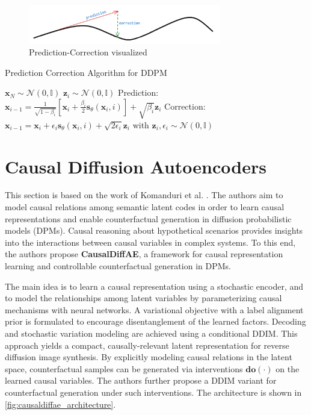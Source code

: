 \documentclass{article}
\newcommand{\x}{\mathbf{x}}
\newcommand{\N}{\mathcal{N}}
\begin{document}
	 \begin{figure}[H]
	 	\centering
	 	\includegraphics[width=0.75\textwidth]{prediction-correction} 
	 	\caption{Prediction-Correction visualized}
	 	\label{fig:prediction_correction}
	 \end{figure}
	
	 \begin{algorithm}[H]
	 \caption{Prediction Correction Algorithm for DDPM \cite{song2021}}
	 \begin{algorithmic}[1]
	 	\State $\x_N \sim \N (0, \mathbb{I})$
	 		\State $\boldsymbol{z}_i \sim \N(0, \mathbb{I})$
		 	\State Prediction: $\displaystyle \x_{i-1} = \frac{1}{\sqrt{1 - \beta_i}} \left[ \x_i + \frac{\beta_i}{2} \boldsymbol{s}_\theta (\x_i, i) \right] + \sqrt{\beta_i} \boldsymbol{z}_i$ 
		 		\State Correction: $\x_{i-1} = \x_i + \epsilon_i \boldsymbol{s}_\theta (\x_i, i) + \sqrt{2 \epsilon_i} \boldsymbol{z}_i$ with $\boldsymbol{z}_i, \epsilon_i \sim \N(0, \mathbb{I})$
		 	\EndFor
	 	\EndFor
	 \end{algorithmic}
	 \end{algorithm}
	 
	 \section{Causal Diffusion Autoencoders}
	 
	 This section is based on the work of Komanduri et al. \cite{akomandu2024}. The authors aim to model causal relations among semantic latent codes in order to learn causal representations and enable counterfactual generation in diffusion probabilistic models (DPMs). Causal reasoning about hypothetical scenarios provides insights into the interactions between causal variables in complex systems. To this end, the authors propose \textbf{CausalDiffAE}, a framework for causal representation learning and controllable counterfactual generation in DPMs.
	 
	 The main idea is to learn a causal representation using a stochastic encoder, and to model the relationships among latent variables by parameterizing causal mechanisms with neural networks. A variational objective with a label alignment prior is formulated to encourage disentanglement of the learned factors. Decoding and stochastic variation modeling are achieved using a conditional DDIM. This approach yields a compact, causally-relevant latent representation for reverse diffusion image synthesis. By explicitly modeling causal relations in the latent space, counterfactual samples can be generated via interventions $\boldsymbol{do}(\cdot)$ on the learned causal variables. The authors further propose a DDIM variant for counterfactual generation under such interventions. The architecture is shown in \autoref{fig:causaldiffae_architecture}.
	 
\end{document}
